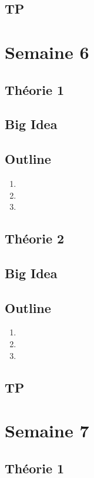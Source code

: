 \documentclass{article}
\begin{document}
\subsection{TP}

\pagebreak
\section{Semaine 6}
\subsection{Théorie 1}
\subsection*{Big Idea}
\subsection*{Outline}
\begin{enumerate}
    \item
    \item
    \item
\end{enumerate}
\subsection{Théorie 2}
\subsection*{Big Idea}
\subsection*{Outline}
\begin{enumerate}
    \item
    \item
    \item
\end{enumerate}
\subsection{TP}

\pagebreak
\section{Semaine 7}
\subsection{Théorie 1}
\end{document}
